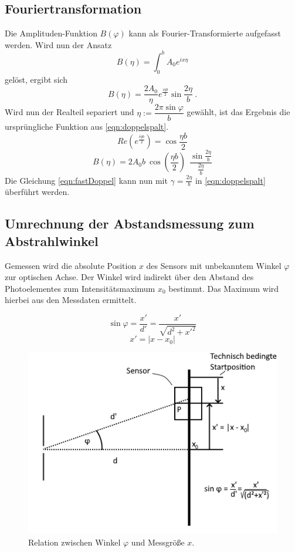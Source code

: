 \subsection{Fouriertransformation}
Die Amplituden-Funktion $B(\varphi)$ kann als Fourier-Transformierte aufgefasst werden.
Wird nun der Ansatz
\begin{equation}
  B(\eta) = \int_{0}^{b}A_0e^{ix\eta}
\end{equation}
gelöst, ergibt sich
\begin{equation}
  B(\eta) = \frac{2A_0}{\eta}e^{\frac{i\eta b}{2}}\sin{\frac{2\eta}{b}} \:.
\end{equation}
Wird nun der Realteil separiert und $\eta := \dfrac{2\pi \sin{\varphi}}{b}$ gewählt, ist das Ergebnis die ursprüngliche Funktion aus \eqref{eqn:doppelspalt}.
\begin{equation}
  Re(e^{\frac{i\eta b}{2}}) = \cos{\frac{\eta b}{2}}
\end{equation}
\begin{equation}
  B(\eta) = 2A_0b\:\cos{(\frac{\eta b}{2})}\:\:\frac{\sin{\frac{2\eta}{b}}}{\frac{2\eta}{b}}
  \label{eqn:fastDoppel}
\end{equation}
Die Gleichung \eqref{eqn:fastDoppel} kann nun mit $\gamma = \frac{2\eta}{b}$ in \eqref{eqn:doppelspalt} überführt werden.

\subsection{Umrechnung der Abstandsmessung zum Abstrahlwinkel}
Gemessen wird die absolute Position $x$ des Sensors mit unbekanntem Winkel $\varphi$ zur optischen Achse.
Der Winkel wird indirekt über den Abstand des Photoelementes zum Intensitätsmaximum $x_0$ bestimmt.
Das Maximum wird hierbei aus den Messdaten ermittelt.

\begin{equation}
  \sin{\varphi} = \frac{x'}{d'} = \frac{x'}{\sqrt{d^2+x'^2}}
\end{equation}
\begin{equation}
  x' = |x-x_0|
\end{equation}

\begin{figure}
  \centering
  \includegraphics[width=.8\textwidth]{plots/x_to_angle.png}
  \caption{Relation zwischen Winkel $\varphi$ und Messgröße $x$.}
  \label{fig:xToAngle}
\end{figure}